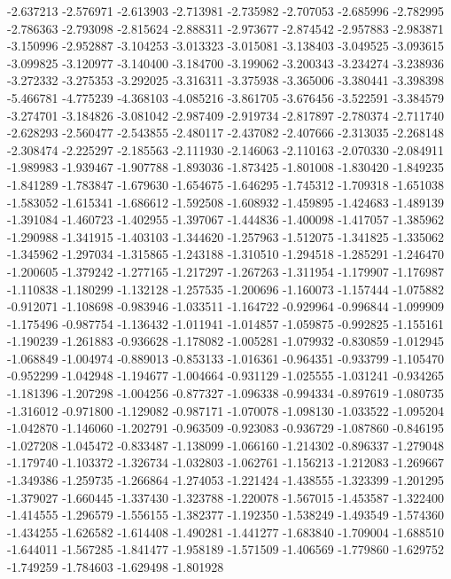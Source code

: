 -2.637213
-2.576971
-2.613903
-2.713981
-2.735982
-2.707053
-2.685996
-2.782995
-2.786363
-2.793098
-2.815624
-2.888311
-2.973677
-2.874542
-2.957883
-2.983871
-3.150996
-2.952887
-3.104253
-3.013323
-3.015081
-3.138403
-3.049525
-3.093615
-3.099825
-3.120977
-3.140400
-3.184700
-3.199062
-3.200343
-3.234274
-3.238936
-3.272332
-3.275353
-3.292025
-3.316311
-3.375938
-3.365006
-3.380441
-3.398398
-5.466781
-4.775239
-4.368103
-4.085216
-3.861705
-3.676456
-3.522591
-3.384579
-3.274701
-3.184826
-3.081042
-2.987409
-2.919734
-2.817897
-2.780374
-2.711740
-2.628293
-2.560477
-2.543855
-2.480117
-2.437082
-2.407666
-2.313035
-2.268148
-2.308474
-2.225297
-2.185563
-2.111930
-2.146063
-2.110163
-2.070330
-2.084911
-1.989983
-1.939467
-1.907788
-1.893036
-1.873425
-1.801008
-1.830420
-1.849235
-1.841289
-1.783847
-1.679630
-1.654675
-1.646295
-1.745312
-1.709318
-1.651038
-1.583052
-1.615341
-1.686612
-1.592508
-1.608932
-1.459895
-1.424683
-1.489139
-1.391084
-1.460723
-1.402955
-1.397067
-1.444836
-1.400098
-1.417057
-1.385962
-1.290988
-1.341915
-1.403103
-1.344620
-1.257963
-1.512075
-1.341825
-1.335062
-1.345962
-1.297034
-1.315865
-1.243188
-1.310510
-1.294518
-1.285291
-1.246470
-1.200605
-1.379242
-1.277165
-1.217297
-1.267263
-1.311954
-1.179907
-1.176987
-1.110838
-1.180299
-1.132128
-1.257535
-1.200696
-1.160073
-1.157444
-1.075882
-0.912071
-1.108698
-0.983946
-1.033511
-1.164722
-0.929964
-0.996844
-1.099909
-1.175496
-0.987754
-1.136432
-1.011941
-1.014857
-1.059875
-0.992825
-1.155161
-1.190239
-1.261883
-0.936628
-1.178082
-1.005281
-1.079932
-0.830859
-1.012945
-1.068849
-1.004974
-0.889013
-0.853133
-1.016361
-0.964351
-0.933799
-1.105470
-0.952299
-1.042948
-1.194677
-1.004664
-0.931129
-1.025555
-1.031241
-0.934265
-1.181396
-1.207298
-1.004256
-0.877327
-1.096338
-0.994334
-0.897619
-1.080735
-1.316012
-0.971800
-1.129082
-0.987171
-1.070078
-1.098130
-1.033522
-1.095204
-1.042870
-1.146060
-1.202791
-0.963509
-0.923083
-0.936729
-1.087860
-0.846195
-1.027208
-1.045472
-0.833487
-1.138099
-1.066160
-1.214302
-0.896337
-1.279048
-1.179740
-1.103372
-1.326734
-1.032803
-1.062761
-1.156213
-1.212083
-1.269667
-1.349386
-1.259735
-1.266864
-1.274053
-1.221424
-1.438555
-1.323399
-1.201295
-1.379027
-1.660445
-1.337430
-1.323788
-1.220078
-1.567015
-1.453587
-1.322400
-1.414555
-1.296579
-1.556155
-1.382377
-1.192350
-1.538249
-1.493549
-1.574360
-1.434255
-1.626582
-1.614408
-1.490281
-1.441277
-1.683840
-1.709004
-1.688510
-1.644011
-1.567285
-1.841477
-1.958189
-1.571509
-1.406569
-1.779860
-1.629752
-1.749259
-1.784603
-1.629498
-1.801928
